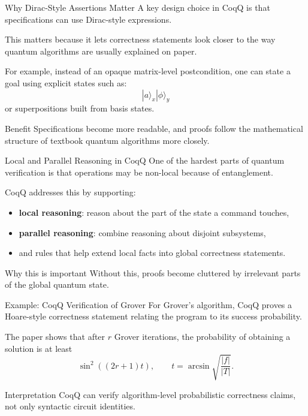 \documentclass[aspectratio=169]{beamer}
\begin{document}
\begin{frame}{Why Dirac-Style Assertions Matter}
\justifying
A key design choice in CoqQ is that specifications can use Dirac-style expressions.

\vspace{0.7em}
This matters because it lets correctness statements look closer to the way
quantum algorithms are usually explained on paper.

\vspace{0.7em}
For example, instead of an opaque matrix-level postcondition, one can state a goal
using explicit states such as:
\[
|a\rangle_x |\phi\rangle_y
\]
or superpositions built from basis states.

\vspace{0.7em}
\begin{alertblock}{Benefit}
Specifications become more readable, and proofs follow the mathematical structure
of textbook quantum algorithms more closely.
\end{alertblock}
\end{frame}
\begin{frame}{Local and Parallel Reasoning in CoqQ}
\justifying
One of the hardest parts of quantum verification is that operations may be non-local
because of entanglement.

\vspace{0.7em}
CoqQ addresses this by supporting:
\begin{itemize}
    \item \textbf{local reasoning}: reason about the part of the state a command touches,
    \item \textbf{parallel reasoning}: combine reasoning about disjoint subsystems,
    \item and rules that help extend local facts into global correctness statements.
\end{itemize}

\vspace{0.7em}
\begin{block}{Why this is important}
Without this, proofs become cluttered by irrelevant parts of the global quantum state.
\end{block}
\end{frame}
\begin{frame}{Example: CoqQ Verification of Grover}
\justifying
For Grover's algorithm, CoqQ proves a Hoare-style correctness statement relating
the program to its success probability.

\vspace{0.7em}
The paper shows that after \(r\) Grover iterations, the probability of obtaining
a solution is at least
\[
\sin^2((2r+1)t),
\qquad
t = \arcsin \sqrt{\frac{|f|}{|T|}}.
\]

\vspace{0.7em}
\begin{alertblock}{Interpretation}
CoqQ can verify algorithm-level probabilistic correctness claims, not only
syntactic circuit identities.
\end{alertblock}
\end{frame}
\end{document}
